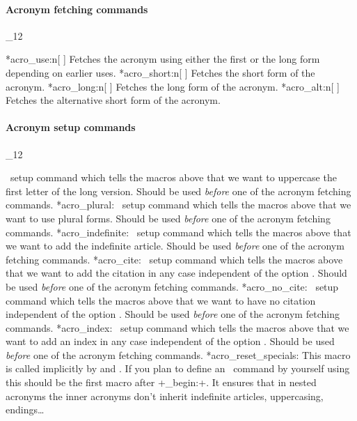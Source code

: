 \documentclass[load-preamble+]{cnltx-doc}
\makeatletter
\renewenvironment{commands}
  {%
    \cnltx@set@catcode_{12}%
    \let\command\cnltx@command
    \cnltxlist
  }
  {\endcnltxlist}
\makeatother
\begin{document}
\paragraph{Acronym fetching commands}
\begin{commands}
  \command*{acro_use:n}[ ]
    Fetches the acronym using either the first or the long form depending on
    earlier uses.
  \command*{acro_short:n}[ ]
    Fetches the short form of the acronym.
  \command*{acro_long:n}[ ]
    Fetches the long form of the acronym.
  \command*{acro_alt:n}[ ]
    Fetches the alternative short form of the acronym.
\end{commands}

\paragraph{Acronym setup commands}
\begin{commands}
  \command*{acro_first_upper:}
    \acro\ setup command which tells the macros above that we want to
    uppercase the first letter of the long version.  Should be used
    \emph{before} one of the acronym fetching commands.
  \command*{acro_plural:}
    \acro\ setup command which tells the macros above that we want to use
    plural forms. Should be used \emph{before} one of the acronym fetching
    commands.
  \command*{acro_indefinite:}
    \acro\ setup command which tells the macros above that we want to add the
    indefinite article.  Should be used \emph{before} one of the acronym
    fetching commands.
  \command*{acro_cite:}
    \acro\ setup command which tells the macros above that we want to add the
    citation in any case independent of the option .  Should be
    used \emph{before} one of the acronym fetching commands.
  \command*{acro_no_cite:}
    \acro\ setup command which tells the macros above that we want to have no
    citation independent of the option .  Should be used
    \emph{before} one of the acronym fetching commands.
  \command*{acro_index:}
    \acro\ setup command which tells the macros above that we want to add an
    index in any case independent of the option .  Should be
    used \emph{before} one of the acronym fetching commands.
  \command*{acro_reset_specials:}
    This macro is called implicitly by 
    and .  If you plan to define an \acro\ command by
    yourself using  this should be the first macro
    after \verbcode+\acro_begin:+.  It ensures that in nested acronyms the
    inner acronyms don't inherit indefinite articles, uppercasing,
    endings\ldots
\end{commands}
\end{document}
